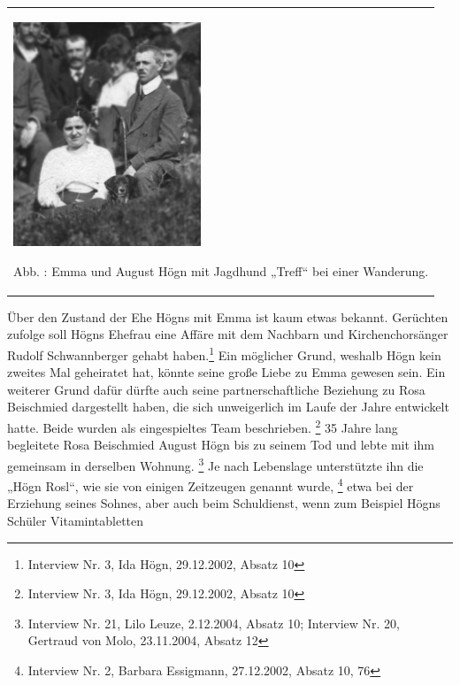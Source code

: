 \documentclass[a4paper]{article}
\newcounter{Abb}
\renewcommand\theAbb{\arabic{Abb}}
\begin{document}
\begin{center}
\begin{minipage}{5.992cm}
\begin{center}
\tablefirsthead{}
\tablehead{}
\tabletail{}
\tablelasttail{}
\begin{supertabular}{m{5.7920003cm}}

\includegraphics[width=5.609cm,height=6.705cm]{pictures/zulassungsarbeit-img024.jpg}

Abb. \stepcounter{Abb}{\theAbb}: Emma und August Högn mit Jagdhund
„Treff“ bei einer Wanderung.\\
\end{supertabular}
\end{center}
\end{minipage}
\end{center}
Über den Zustand der Ehe Högns mit Emma ist kaum etwas bekannt.
Gerüchten zufolge soll Högns Ehefrau eine Affäre mit dem Nachbarn und
Kirchenchorsänger Rudolf Schwannberger gehabt haben.\footnote{
Interview Nr. 3, Ida Högn, 29.12.2002, Absatz 10} Ein möglicher Grund,
weshalb Högn kein zweites Mal geheiratet hat, könnte seine große Liebe
zu Emma gewesen sein. Ein weiterer Grund dafür dürfte auch seine
partnerschaftliche Beziehung zu Rosa Beischmied dargestellt haben, die
sich unweigerlich im Laufe der Jahre entwickelt hatte. Beide wurden als
eingespieltes Team beschrieben. \footnote{Interview Nr. 3, Ida Högn,
29.12.2002, Absatz 10} 35 Jahre lang begleitete Rosa Beischmied August
Högn bis zu seinem Tod und lebte mit ihm gemeinsam in derselben
Wohnung. \footnote{Interview Nr. 21, Lilo Leuze, 2.12.2004, Absatz 10;
Interview Nr. 20, Gertraud von Molo, 23.11.2004, Absatz 12} Je nach
Lebenslage unterstützte ihn die „Högn Rosl“, wie sie von einigen
Zeitzeugen genannt wurde, \footnote{Interview Nr. 2, Barbara Essigmann,
27.12.2002, Absatz 10, 76} etwa bei der Erziehung seines Sohnes, aber
auch beim Schuldienst, wenn zum Beispiel Högns Schüler Vitamintabletten
\end{document}
